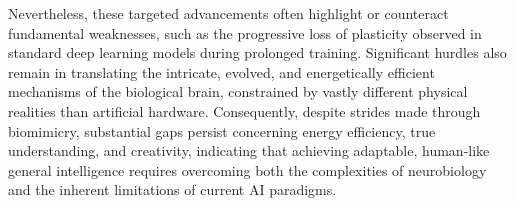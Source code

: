 \documentclass[
10pt, %
a4paper, %
oneside, %
headinclude,footinclude, %
BCOR5mm, %
]{scrartcl}
\begin{document}
Nevertheless, these targeted advancements often highlight or counteract fundamental weaknesses, such as the progressive loss of plasticity observed in standard deep learning models during prolonged training. Significant hurdles also remain in translating the intricate, evolved, and energetically efficient mechanisms of the biological brain, constrained by vastly different physical realities than artificial hardware. Consequently, despite strides made through biomimicry, substantial gaps persist concerning energy efficiency, true understanding, and creativity, indicating that achieving adaptable, human-like general intelligence requires overcoming both the complexities of neurobiology and the inherent limitations of current AI paradigms.
\newpage
\nocite{*}
\renewcommand{\refname}{\spacedlowsmallcaps{Bibliography}} %





\end{document}
